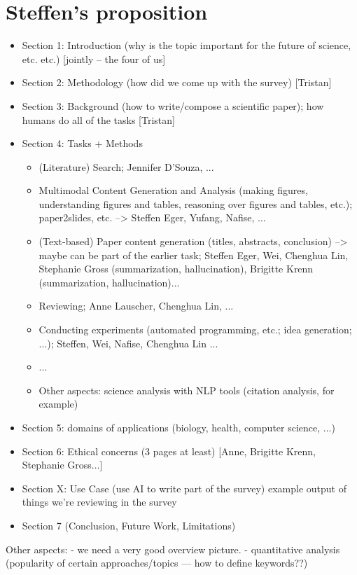 \section*{Steffen's proposition}

\begin{itemize}
    \item Section 1: Introduction (why is the topic important for the future of science, etc. etc.) [jointly -- the four of us]
    \item Section 2: Methodology (how did we come up with the survey) [Tristan]
    \item Section 3: Background (how to write/compose a scientific paper); how humans do all of the tasks [Tristan]
    \item Section 4: Tasks + Methods
    \begin{itemize}
    \item (Literature) Search; Jennifer D'Souza, ...
    \item Multimodal Content Generation and Analysis (making figures, understanding figures and tables, reasoning over figures and tables, etc.); paper2slides, etc. --> Steffen Eger, Yufang, Nafise, ...
    \item (Text-based) Paper content generation (titles, abstracts, conclusion) --> maybe can be part of the earlier task; Steffen Eger, Wei, Chenghua Lin, Stephanie Gross (summarization, hallucination), Brigitte Krenn (summarization, hallucination)...
    \item Reviewing; Anne Lauscher, Chenghua Lin, ...
    \item Conducting experiments (automated programming, etc.; idea generation; ...); Steffen, Wei, Nafise, Chenghua Lin ...
    \item ...
    \item Other aspects: science analysis with NLP tools (citation analysis, for example)
    \end{itemize}
    \item Section 5: domains of applications (biology, health, computer science, ...)
    \item Section 6: Ethical concerns (3 pages at least) [Anne, Brigitte Krenn, Stephanie Gross...]
    \item Section X: Use Case (use AI to write part of the survey) example output of things we're reviewing in the survey
    \item Section 7 (Conclusion, Future Work, Limitations)
\end{itemize}
Other aspects: 
- we need a very good overview picture.
- quantitative analysis (popularity of certain approaches/topics --- how to define keywords??)

